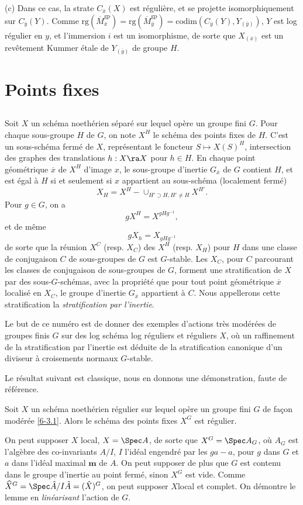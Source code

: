 \documentclass[10pt]{../fichiers-configuration-latex/smfart}
\begin{document}
(c) Dans ce cas, la strate $C_{\overline{x}}(X)$ est régulière, et se projette isomorphiquement sur
$C_{\overline{y}}(Y)$. Comme $\mathrm{rg}(\overline{M}^{\mathrm{gp}}_{\overline{x}}) =
\mathrm{rg}(\overline{M}^{\mathrm{gp}}_{\overline{y}}) =
\mathrm{codim}(C_{\overline{y}}(Y),Y_{(\overline{y})})$, $Y$ est log régulier en $y$, et l'immersion
$i$ est un isomorphisme, de sorte que $X_{(\overline{x})}$ est un revêtement Kummer étale de
$Y_{(\overline{y})}$ de groupe $H$.  \section{Points fixes} \subsection{}\label{6-stratification}
Soit $X$ un schéma noethérien séparé sur lequel opère un groupe fini $G$. Pour chaque sous-groupe
$H$ de $G$, on note $X^H$ le schéma des points fixes de $H$. C'est un sous-schéma fermé de $X$,
représentant le foncteur $S \mapsto X(S)^H$, intersection des graphes des translations  $h : X \ra
X$ pour $h \in H$. En chaque point géométrique $\overline{x}$ de $X^H$ d'image $x$, le sous-groupe
d'inertie $G_{\overline{x}}$ de $G$ contient $H$, et est égal à $H$ si et seulement si $x$
appartient au sous-schéma (localement fermé) $$ X_H = X^H - \cup_{H' \supset H, H' \ne H}X^{H'}.  $$
Pour $g \in G$, on a $$ gX^H = X^{gHg^{-1}}, $$ et de même $$ gX_h = X_{gHg^{-1}} $$ de sorte que la
réunion $X^C$ (resp. $X_C$) des $X^H$ (resp. $X_H$) pour $H$ dans une classe de conjugaison $C$ de
sous-groupes de $G$ est $G$-stable. Les $X_C$, pour $C$ parcourant les classes de conjugaison de
sous-groupes de $G$, forment une stratification de $X$ par des sous-$G$-schémas, avec la propriété
que pour tout point géométrique $\overline{x}$ localisé en $X_C$, le groupe d'inertie
$G_{\overline{x}}$ appartient à $C$. Nous appellerons cette stratification la \textit{stratification
par l'inertie}.

Le but de ce numéro est de donner des exemples d'actions très modérées de groupes finis $G$ sur des
log schéma log réguliers et réguliers $X$, où un raffinement de la stratification par l'inertie est
déduite de la stratification canonique d'un diviseur à croisements normaux $G$-stable.

Le résultat suivant est classique, nous en donnons une démonstration, faute de référence.
\begin{proposition}\label{6-pts fixes reguliers} Soit $X$ un schéma noethérien régulier sur lequel
opère un groupe fini $G$ de façon modérée \ref{6-3.1}. Alors le schéma des points fixes $X^G$ est
régulier.  \end{proposition} On peut supposer $X$ local, $X = \Spec A$, de sorte que $X^G = \Spec A_G$,
où $A_G$ est l'algèbre des co-invariants $A/I$, $I$ l'idéal engendré par les $ga - a$, pour $g$ dans
$G$ et $a$ dans l'idéal maximal $\mathbf{m}$ de $A$. On peut supposer de plus que $G$ est contenu
dans le groupe d'inertie au point fermé, sinon $X^G$ est vide. Comme $\widehat X^G = \Spec \hat A/I
\hat A = (\hat X)^G$, on peut supposer $X $local et complet. On démontre le lemme en
\textit{linéarisant} l'action de $G$.
\end{document}
